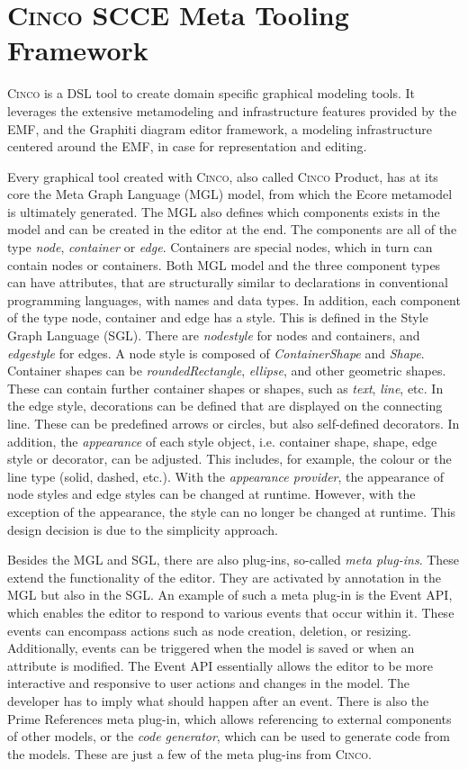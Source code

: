 \section{\textsc{Cinco} SCCE Meta Tooling Framework}
\textsc{Cinco} is a DSL tool to create domain specific graphical modeling tools. It leverages the extensive metamodeling and infrastructure features provided by the EMF, and the Graphiti diagram editor framework, a modeling infrastructure centered around the EMF, in case for representation and editing.~\cite{Wenz.08.09.2023}~\cite{Naujokat.2018}

Every graphical tool created with \textsc{Cinco}, also called \textsc{Cinco} Product, has at its core the Meta Graph Language (MGL) model, from which the Ecore metamodel is ultimately generated. The MGL also defines which components exists in the model and can be created in the editor at the end. The components are all of the type \textit{node}, \textit{container} or \textit{edge}. Containers are special nodes, which in turn can contain nodes or containers. Both MGL model and the three component types can have attributes, that are structurally similar to declarations in conventional programming languages, with names and data types. In addition, each component of the type node, container and edge has a style. This is defined in the Style Graph Language (SGL). There are \textit{nodestyle} for nodes and containers, and \textit{edgestyle} for edges. A node style is composed of \textit{ContainerShape} and \textit{Shape}. Container shapes can be \textit{roundedRectangle}, \textit{ellipse}, and other geometric shapes. These can contain further container shapes or shapes, such as \textit{text}, \textit{line}, etc. In the edge style, decorations can be defined that are displayed on the connecting line. These can be predefined arrows or circles, but also self-defined decorators. In addition, the \textit{appearance} of each style object, i.e. container shape, shape, edge style or decorator, can be adjusted. This includes, for example, the colour or the line type (solid, dashed, etc.). With the \textit{appearance provider}, the appearance of node styles and edge styles can be changed at runtime. However, with the exception of the appearance, the style can no longer be changed at runtime. This design decision is due to the simplicity approach. 

Besides the MGL and SGL, there are also plug-ins, so-called \textit{meta plug-ins}. These extend the functionality of the editor. They are activated by annotation in the MGL but also in the SGL. An example of such a meta plug-in is the Event API, which enables the editor to respond to various events that occur within it. These events can encompass actions such as node creation, deletion, or resizing. Additionally, events can be triggered when the model is saved or when an attribute is modified. The Event API essentially allows the editor to be more interactive and responsive to user actions and changes in the model. The developer has to imply what should happen after an event. There is also the Prime References meta plug-in, which allows referencing to external components of other models, or the \textit{code generator}, which can be used to generate code from the models. These are just a few of the meta plug-ins from \textsc{Cinco}.

